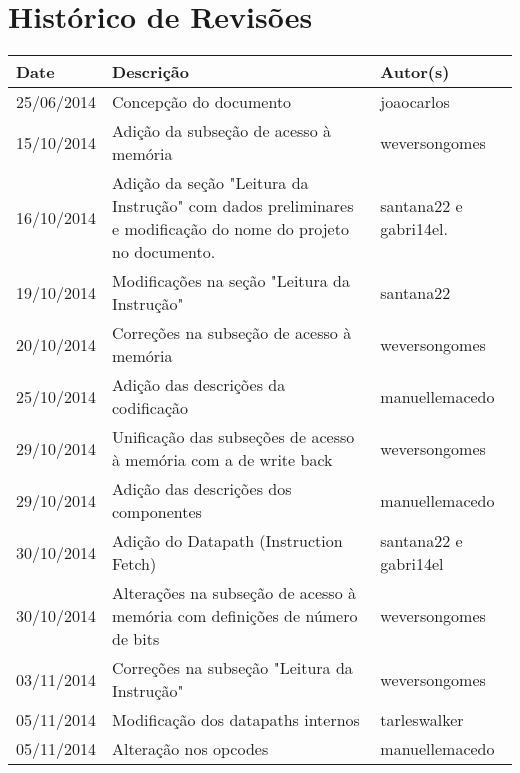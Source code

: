 \documentclass{report}
\begin{document}
\capa
%

\chapter*{Histórico de Revisões}
  \vspace*{1cm}
  \begin{table}[ht]
    \centering
    \begin{tabular}[pos]{|m{2cm} | m{8cm} | m{4cm}|} 
      \hline
      \cellcolor[gray]{0.9}
      \textbf{Date} & \cellcolor[gray]{0.9}\textbf{Descrição} & \cellcolor[gray]{0.9}\textbf{Autor(s)}\\
      \hline
      25/06/2014 & Concepção do documento & joaocarlos \\ \hline
      15/10/2014 & Adição da subseção de acesso à memória & weversongomes \\ \hline
      16/10/2014 & Adição da seção "Leitura da Instrução" com dados preliminares e modificação do nome do projeto no documento. & santana22 e gabri14el.\\ \hline
      19/10/2014 & Modificações na seção "Leitura da Instrução" & santana22 \\ \hline
      20/10/2014 & Correções na subseção de acesso à memória & weversongomes \\ \hline
      25/10/2014 & Adição das descrições da codificação & manuellemacedo \\ \hline
      29/10/2014 & Unificação das subseções de acesso à memória com a de write back & weversongomes \\ \hline
      29/10/2014 & Adição das descrições dos componentes & manuellemacedo \\ \hline
      30/10/2014 & Adição do Datapath (Instruction Fetch) & santana22 e gabri14el \\ \hline
      30/10/2014 & Alterações na subseção de acesso à memória com definições de número de bits & weversongomes \\ \hline
      03/11/2014 & Correções na subseção "Leitura da Instrução" & weversongomes \\ \hline
      05/11/2014 & Modificação dos datapaths internos & tarleswalker \\ \hline
      05/11/2014 & Alteração nos opcodes & manuellemacedo \\ \hline
    \end{tabular}
  \end{table}
\end{document}
